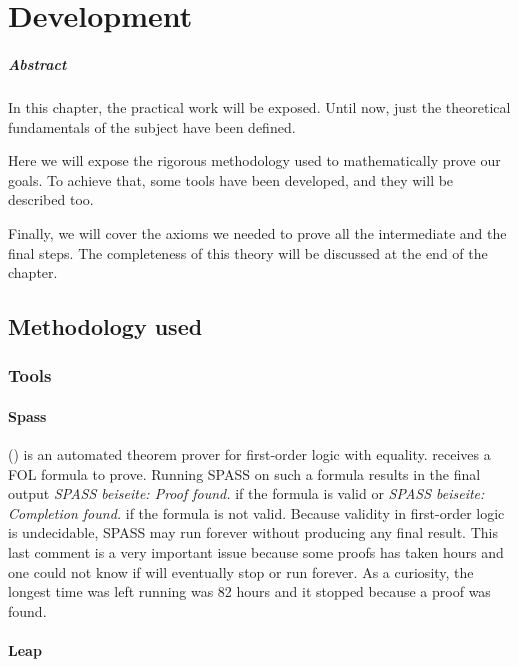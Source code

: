 \chapter{Development\label{sec:develpment}}

\paragraph{Abstract} In this chapter, the practical work will be exposed. Until now, just the theoretical fundamentals of the subject have been defined.

Here we will expose the rigorous methodology used to mathematically prove our goals. To achieve that, some tools have been developed, and they will be described too.

Finally, we will cover the axioms we needed to prove all the intermediate and the final steps. The completeness of this theory will be discussed at the end of the chapter. 

\section{Methodology used}



\subsection{Tools}

\subsubsection{Spass}

\spass () is an automated theorem prover for first-order logic with equality. 
%
\spass receives a \gls{FOL} formula to prove. 
Running SPASS on such a formula results in the final output \textit{SPASS beiseite: Proof found.} if the formula is valid or  \textit{SPASS beiseite: Completion found.} if the formula is not valid.
Because validity in first-order logic is undecidable, SPASS may run forever without producing any final result.
%
This last comment is a very important issue because some proofs has taken hours and one could not know if \spass will eventually stop or run forever.
%
As a curiosity, the longest time \spass was left running was 82 hours and it stopped because a proof was found.


\subsubsection{Leap}


